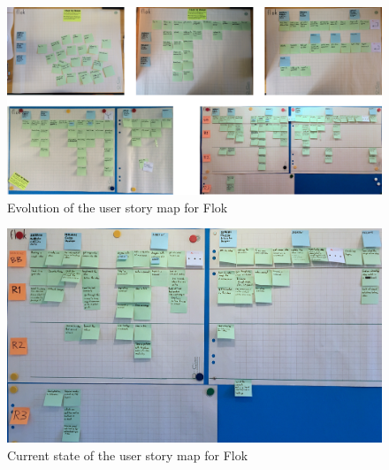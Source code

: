 \documentclass[a4paper,12pt,twoside]{article}
\begin{document}
\begin{figure}[!htb]
    \centering
    \includegraphics[width=\textwidth]{images/flokUsmEvolution.png}
    \caption{Evolution of the user story map for Flok}
    \label{fig.flokUsmEvolution}
\end{figure}

\begin{figure}[!htb]
    \centering
    \includegraphics[width=\textwidth]{images/flokUsmCurrent.jpg}
    \caption{Current state of the user story map for Flok}
    \label{fig.flokUsmCurrent}
\end{figure}

\FloatBarrier
\end{document}

